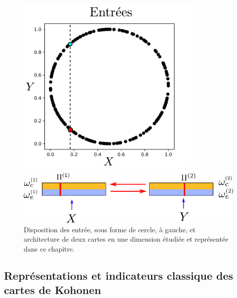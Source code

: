 \begin{figure}
\begin{minipage}{0.4\textwidth}
\centering
\includegraphics[width=0.8\textwidth]{2som_inp_noinformation}
\end{minipage}
\begin{minipage}{0.6\textwidth}
\includegraphics[width=\textwidth]{2som_archi}
\end{minipage}
\caption{Disposition des entrée, sous forme de cercle, à gauche, et architecture de deux cartes en une dimension étudiée et représentée dans ce chapitre.\label{fig:exp}}
\end{figure}

\subsection{Représentations et indicateurs classique des cartes de Kohonen}

